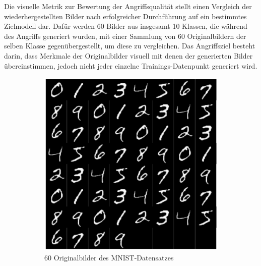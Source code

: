 Die visuelle Metrik zur Bewertung der Angriffsqualität stellt einen Vergleich der wiederhergestellten Bilder nach erfolgreicher Durchführung auf ein bestimmtes Zielmodell dar. Dafür werden 60 Bilder aus insgesamt 10 Klassen, die während des Angriffs generiert wurden, mit einer Sammlung von 60 Originalbildern der selben Klasse gegenübergestellt, um diese zu vergleichen. Das Angriffsziel besteht darin, dass Merkmale der Originalbilder visuell mit denen der generierten Bilder übereinstimmen, jedoch nicht jeder einzelne Trainings-Datenpunkt generiert wird.

\begin{figure}[H]
	\centering
	\begin{subfigure}[b]{0.35\linewidth}
		\includegraphics[width=\linewidth]{Bilder/mnist_orig.png}
		\caption{60 Originalbilder des MNIST-Datensatzes}
		\label{img:kedmi_orig}
	\end{subfigure}
	\hspace{1cm} %
	\begin{subfigure}[b]{0.348\linewidth}

\end{subfigure}
\end{figure}
